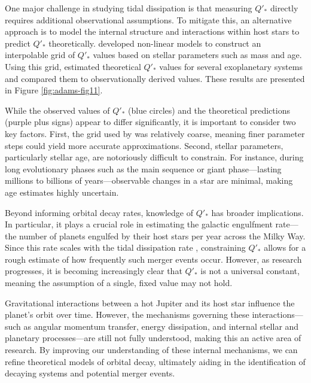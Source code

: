 \documentclass[oneside,12pt]{amsart}
\numberwithin{page}{section}
\begin{document}
One major challenge in studying tidal dissipation is that measuring $Q'_*$ directly requires additional observational assumptions. To mitigate this, an alternative approach is to model the internal structure and interactions within host stars to predict $Q'_*$ theoretically. \citet{weinberg2023orbital} developed non-linear models to construct an interpolable grid of $Q'_*$ values based on stellar parameters such as mass and age. Using this grid, \citet{adams2024doomed} estimated theoretical $Q'_*$ values for several exoplanetary systems and compared them to observationally derived values. These results are presented in Figure \ref{fig:adams-fig11}.

While the observed values of $Q'_*$ (blue circles) and the theoretical predictions (purple plus signs) appear to differ significantly, it is important to consider two key factors. First, the grid used by \citet{adams2024doomed} was relatively coarse, meaning finer parameter steps could yield more accurate approximations. Second, stellar parameters, particularly stellar age, are notoriously difficult to constrain. For instance, during long evolutionary phases such as the main sequence or giant phase—lasting millions to billions of years—observable changes in a star are minimal, making age estimates highly uncertain.

Beyond informing orbital decay rates, knowledge of $Q'_*$ has broader implications. In particular, it plays a crucial role in estimating the galactic engulfment rate—the number of planets engulfed by their host stars per year across the Milky Way. Since this rate scales with the tidal dissipation rate \citep{jackson2023metrics}, constraining $Q'_*$ allows for a rough estimate of how frequently such merger events occur. However, as research progresses, it is becoming increasingly clear that $Q'_*$ is not a universal constant, meaning the assumption of a single, fixed value may not hold.

Gravitational interactions between a hot Jupiter and its host star influence the planet’s orbit over time. However, the mechanisms governing these interactions—such as angular momentum transfer, energy dissipation, and internal stellar and planetary processes—are still not fully understood, making this an active area of research. By improving our understanding of these internal mechanisms, we can refine theoretical models of orbital decay, ultimately aiding in the identification of decaying systems and potential merger events.

\end{document}

